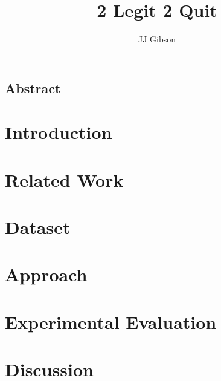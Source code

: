 \documentclass[twoside,10pt]{report}
\newcommand{\clearemptydoublepage}{\newpage{\pagestyle{empty}\cleardoublepage}}
\begin{document}
\title{2 Legit 2 Quit}
\author{JJ Gibson}



\clearpage


\clearemptydoublepage
\setcounter{page}{1}

\begin{centering} \section*{Abstract} \end{centering}


\tableofcontents
\clearpage


\setcounter{page}{1}


\chapter{Introduction}
\label{chap:introduction}


\clearpage

\chapter{Related Work}
\label{chap:related_work}


\clearpage

\chapter{Dataset}
\label{chap:dataset}


\clearpage

\chapter{Approach}
\label{chape:approach}


\clearpage

\chapter{Experimental Evaluation}
\label{chap:experimental_evaluation}


\clearpage

\chapter{Discussion}
\label{chap:discussion}


\clearpage

 
{\small }
\end{document}

